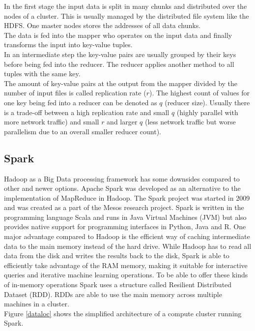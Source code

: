 \noindent In the first stage the input data is split in many chunks and distributed over the nodes of a cluster. This is usually managed by the distributed file system like the HDFS. One master nodes stores the addresses of all data chunks.\\
The data is fed into the mapper who operates on the input data and finally transforms the input into key-value tuples.\\
In an intermediate step the key-value pairs are usually grouped by their keys before being fed into the reducer. The reducer applies another method to all tuples with the same key.\\
The amount of key-value pairs at the output from the mapper divided by the number of input files is called replication rate ($r$). The highest count of values for one key being fed into a reducer can be denoted as $q$ (reducer size). Usually there is a trade-off between a high replication rate and small $q$ (highly parallel with more network traffic) and small $r$ and larger $q$ (less network traffic but worse parallelism due to an overall smaller reducer count).

\subsection{Spark}

Hadoop as a Big Data processing framework has some downsides compared to other and newer options. Apache Spark was developed as an alternative to the implementation of MapReduce in Hadoop. The Spark project was started in 2009 and was created as a part of the Mesos research project. Spark is written in the programming language Scala and runs in Java Virtual Machines (JVM) but also provides native support for programming interfaces in Python, Java and R. 
One major advantage compared to Hadoop is the efficient way of caching intermediate data to the main memory instead of the hard drive. While Hadoop has to read all data from the disk and writes the results back to the disk, Spark is able to efficiently take advantage of the RAM memory, making it suitable for interactive queries and iterative machine learning operations. To be able to offer these kinds of in-memory operations Spark uses a structure called Resilient Distributed Dataset (RDD). RDDs are able to use the main memory across multiple machines in a cluster. \cite[p. 13]{sparkbook1}\\ 
Figure \ref{dataloc} shows the simplified architecture of a compute cluster running Spark. 


